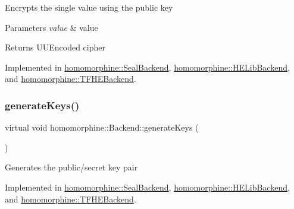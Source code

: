 Encrypts the single value using the public key


\begin{DoxyParams}{Parameters}
{\em value} & value \\
\hline
\end{DoxyParams}
\begin{DoxyReturn}{Returns}
U\+U\+Encoded cipher 
\end{DoxyReturn}


Implemented in \mbox{\hyperlink{classhomomorphine_1_1_seal_backend_af64a70096e488a75aadbd934cf73d482}{homomorphine\+::\+Seal\+Backend}}, \mbox{\hyperlink{classhomomorphine_1_1_h_e_lib_backend_a6a958824a123eab41b2099dbc001dc13}{homomorphine\+::\+H\+E\+Lib\+Backend}}, and \mbox{\hyperlink{classhomomorphine_1_1_t_f_h_e_backend_a094f4b4a510adf82fe7366e807c518d2}{homomorphine\+::\+T\+F\+H\+E\+Backend}}.

\mbox{\label{classhomomorphine_1_1_backend_a88cd9469f1394a0a2d15c2f603280763}} 
\subsubsection{\texorpdfstring{generateKeys()}{generateKeys()}}
{\footnotesize\ttfamily virtual void homomorphine\+::\+Backend\+::generate\+Keys (\begin{DoxyParamCaption}{ }\end{DoxyParamCaption})\hspace{0.3cm}{\ttfamily [pure virtual]}}

Generates the public/secret key pair 

Implemented in \mbox{\hyperlink{classhomomorphine_1_1_seal_backend_a1e2ed46b896d4a5b5d930ec7bcd3207b}{homomorphine\+::\+Seal\+Backend}}, \mbox{\hyperlink{classhomomorphine_1_1_h_e_lib_backend_a2c6ed82eeb597b99ae6cdb2734412a0f}{homomorphine\+::\+H\+E\+Lib\+Backend}}, and \mbox{\hyperlink{classhomomorphine_1_1_t_f_h_e_backend_a6d71d6012726cd1ea5e1b3e72efd58d4}{homomorphine\+::\+T\+F\+H\+E\+Backend}}.

\mbox{\label{classhomomorphine_1_1_backend_a6c6ed25dec9809b3f216e185e8026e97}} 
